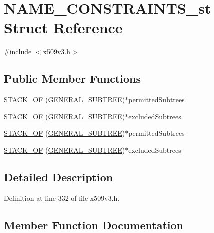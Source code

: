 \hypertarget{struct_n_a_m_e___c_o_n_s_t_r_a_i_n_t_s__st}{}\section{N\+A\+M\+E\+\_\+\+C\+O\+N\+S\+T\+R\+A\+I\+N\+T\+S\+\_\+st Struct Reference}
\label{struct_n_a_m_e___c_o_n_s_t_r_a_i_n_t_s__st}


{\ttfamily \#include $<$x509v3.\+h$>$}

\subsection*{Public Member Functions}
\begin{DoxyCompactItemize}
\item 
\hyperlink{struct_n_a_m_e___c_o_n_s_t_r_a_i_n_t_s__st_aa691c626bceb7113446a7618e4c868c8}{S\+T\+A\+C\+K\+\_\+\+OF} (\hyperlink{crypto_2x509v3_2x509v3_8h_a21ea7e841d8aba5e2db834fbcf63c878}{G\+E\+N\+E\+R\+A\+L\+\_\+\+S\+U\+B\+T\+R\+EE})$\ast$permitted\+Subtrees
\item 
\hyperlink{struct_n_a_m_e___c_o_n_s_t_r_a_i_n_t_s__st_a28cb05b5732c3ff5edfbc16fa6e8ff5f}{S\+T\+A\+C\+K\+\_\+\+OF} (\hyperlink{crypto_2x509v3_2x509v3_8h_a21ea7e841d8aba5e2db834fbcf63c878}{G\+E\+N\+E\+R\+A\+L\+\_\+\+S\+U\+B\+T\+R\+EE})$\ast$excluded\+Subtrees
\item 
\hyperlink{struct_n_a_m_e___c_o_n_s_t_r_a_i_n_t_s__st_aa691c626bceb7113446a7618e4c868c8}{S\+T\+A\+C\+K\+\_\+\+OF} (\hyperlink{crypto_2x509v3_2x509v3_8h_a21ea7e841d8aba5e2db834fbcf63c878}{G\+E\+N\+E\+R\+A\+L\+\_\+\+S\+U\+B\+T\+R\+EE})$\ast$permitted\+Subtrees
\item 
\hyperlink{struct_n_a_m_e___c_o_n_s_t_r_a_i_n_t_s__st_a28cb05b5732c3ff5edfbc16fa6e8ff5f}{S\+T\+A\+C\+K\+\_\+\+OF} (\hyperlink{crypto_2x509v3_2x509v3_8h_a21ea7e841d8aba5e2db834fbcf63c878}{G\+E\+N\+E\+R\+A\+L\+\_\+\+S\+U\+B\+T\+R\+EE})$\ast$excluded\+Subtrees
\end{DoxyCompactItemize}


\subsection{Detailed Description}


Definition at line 332 of file x509v3.\+h.



\subsection{Member Function Documentation}
